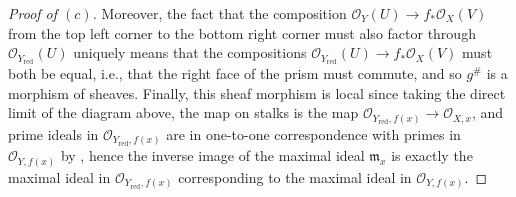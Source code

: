 \documentclass[10pt]{article}
\theoremstyle{definition}
\theoremstyle{remark}
\numberwithin{equation}{section}
\numberwithin{figure}{subsubsection}
\newcommand{\OO}{\mathcal{O}}
\newcommand{\red}{\mathrm{red}}
\begin{document}
\begin{proof}[Proof of $(c)$]
  Moreover, the fact that the composition $\OO_Y(U) \to f_*\OO_X(V)$ from the
  top left corner to the bottom right corner must also factor through
  $\OO_{Y_\red}(U)$ uniquely means that the compositions $\OO_{Y_\red}(U) \to
  f_*\OO_X(V)$ must both be equal, i.e., that the right face of the prism must
  commute, and so $g^\#$ is a morphism of sheaves. Finally, this sheaf morphism
  is local since taking the direct limit of the diagram above, the map on stalks
  is the map $\OO_{Y_\red,f(x)} \to \OO_{X,x}$, and prime ideals in
  $\OO_{Y_\red,f(x)}$ are in one-to-one correspondence with primes in
  $\OO_{Y,f(x)}$ by \cite[Prop.~1.1]{AM69}, hence the inverse image of the
  maximal ideal $\mathfrak{m}_x$ is exactly the maximal ideal in
  $\OO_{Y_\red,f(x)}$ corresponding to the maximal ideal in $\OO_{Y,f(x)}$.
\end{proof}
\end{document}

